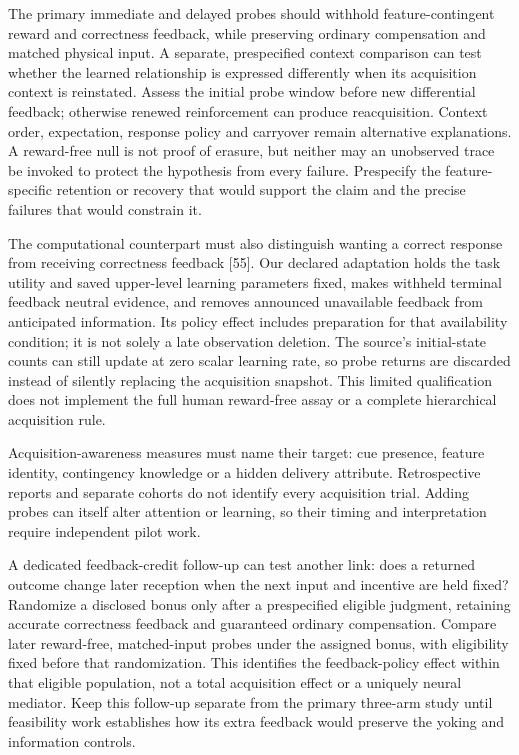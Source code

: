 \documentclass[
  american,
  11pt,
  letterpaper,
]{article}
\begin{document}
The primary immediate and delayed probes should withhold feature-contingent reward and correctness feedback, while preserving ordinary compensation and matched physical input. A separate, prespecified context comparison can test whether the learned relationship is expressed differently when its acquisition context is reinstated. Assess the initial probe window before new differential feedback; otherwise renewed reinforcement can produce reacquisition. Context order, expectation, response policy and carryover remain alternative explanations. A reward-free null is not proof of erasure, but neither may an unobserved trace be invoked to protect the hypothesis from every failure. Prespecify the feature-specific retention or recovery that would support the claim and the precise failures that would constrain it.

The computational counterpart must also distinguish wanting a correct response from receiving correctness feedback {[}55{]}. Our declared adaptation holds the task utility and saved upper-level learning parameters fixed, makes withheld terminal feedback neutral evidence, and removes announced unavailable feedback from anticipated information. Its policy effect includes preparation for that availability condition; it is not solely a late observation deletion. The source's initial-state counts can still update at zero scalar learning rate, so probe returns are discarded instead of silently replacing the acquisition snapshot. This limited qualification does not implement the full human reward-free assay or a complete hierarchical acquisition rule.

Acquisition-awareness measures must name their target: cue presence, feature identity, contingency knowledge or a hidden delivery attribute. Retrospective reports and separate cohorts do not identify every acquisition trial. Adding probes can itself alter attention or learning, so their timing and interpretation require independent pilot work.

A dedicated feedback-credit follow-up can test another link: does a returned outcome change later reception when the next input and incentive are held fixed? Randomize a disclosed bonus only after a prespecified eligible judgment, retaining accurate correctness feedback and guaranteed ordinary compensation. Compare later reward-free, matched-input probes under the assigned bonus, with eligibility fixed before that randomization. This identifies the feedback-policy effect within that eligible population, not a total acquisition effect or a uniquely neural mediator. Keep this follow-up separate from the primary three-arm study until feasibility work establishes how its extra feedback would preserve the yoking and information controls.
\end{document}
